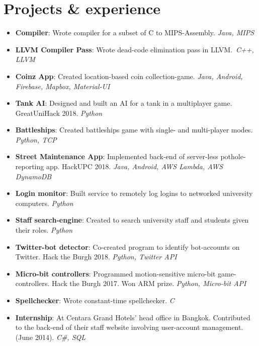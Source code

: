 \documentclass[11pt,a4paper]{article}
\begin{document}
\section*{Projects \& experience}
\begin{itemize}
    \item \textbf{Compiler}:
        Wrote compiler for a subset of C to MIPS-Assembly.
        \textit{Java, MIPS}
    \item \textbf{LLVM Compiler Pass}:
        Wrote dead-code elimination pass in LLVM.\
        \textit{C++, LLVM}
    \item \textbf{Coinz App}:
        Created location-based coin collection-game.
		\textit{Java, Android, Firebase, Mapbox, Material-UI}
    \item \textbf{Tank AI}:
        Designed and built an AI for a tank in a multiplayer game. GreatUniHack 2018.
        \textit{Python}
    \item \textbf{Battleships}:
        Created battleships game with single- and multi-player modes.
        \textit{Python, TCP}
    \item \textbf{Street Maintenance App}:
        Implemented back-end of server-less pothole-reporting app. HackUPC 2018.
		\textit{Java, Android, AWS Lambda, AWS DynamoDB}
    \item \textbf{Login monitor}:
        Built service to remotely log logins to networked university computers.
        \textit{Python}
    \item \textbf{Staff search-engine}:
        Created to search university staff and students given their roles.
        \textit{Python}
    \item \textbf{Twitter-bot detector}:
        Co-created program to identify bot-accounts on Twitter. Hack the Burgh 2018.
        \textit{Python, Twitter API}
    \item \textbf{Micro-bit controllers}:
        Programmed motion-sensitive micro-bit game-controllers. Hack the Burgh 2017.
        Won ARM prize.
        \textit{Python, Micro-bit API}
    \item \textbf{Spellchecker}:
        Wrote constant-time spellchecker.
        \textit{C}
    \item \textbf{Internship}:
        At Centara Grand Hotels' head office in Bangkok.
        Contributed to the back-end of their staff website involving user-account management.
        (June 2014).
        \textit{C\#, SQL}
\end{itemize}

\midrule
\end{document}
